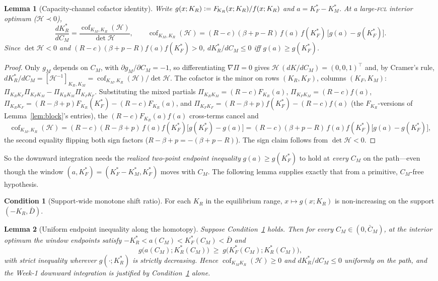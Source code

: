 \documentclass[11pt,reqno]{amsart}
\theoremstyle{plain}
\newtheorem{lemma}{Lemma}
\theoremstyle{definition}
\newtheorem{condition}{Condition}
\theoremstyle{remark}
\newcommand{\KR}{K_R}
\newcommand{\KF}{K_F}
\newcommand{\KM}{K_M}
\newcommand{\KRs}{K_R^{*}}
\newcommand{\KFs}{K_F^{*}}
\newcommand{\KMs}{K_M^{*}}
\newcommand{\Dbar}{\bar D}
\newcommand{\CM}{C_M}
\newcommand{\CMbar}{\bar C_M}
\newcommand{\bp}{\beta+p}
\newcommand{\FKR}{F_{\!\KR}}
\newcommand{\eqdef}{\vcentcolon=}
\newcommand{\Hcal}{\mathcal H}
\newcommand{\cof}{\operatorname{cof}}
\begin{document}
\begin{lemma}[Capacity-channel cofactor identity]\label{lem:cofactor}
Write $g(x;\KR)\eqdef\FKR(x;\KR)/f(x;\KR)$ and $a=\KFs-\KMs$. At a large-\textsc{fcl}
interior optimum ($\Hcal\prec0$),
\begin{equation}\label{eq:cofactor}
  \frac{d\KRs}{d\CM}=\frac{\cof_{\KM,\KR}(\Hcal)}{\det\Hcal},
  \qquad
  \cof_{\KM,\KR}(\Hcal)=(R-c)(\bp-R)\,f(a)\,f(\KFs)\,\big[g(a)-g(\KFs)\big].
\end{equation}
Since $\det\Hcal<0$ and $(R-c)(\bp-R)f(a)f(\KFs)>0$, $d\KRs/d\CM\le0$ \emph{iff}
$g(a)\ge g(\KFs)$.
\end{lemma}
\begin{proof}
Only $g_M$ depends on $\CM$, with $\partial g_M/\partial\CM=-1$, so differentiating
$\nabla\Pi=0$ gives $\Hcal\,(dK/d\CM)=(0,0,1)^{\!\top}$ and, by Cramer's rule,
$d\KRs/d\CM=[\Hcal^{-1}]_{\KR,\KM}=\cof_{\KM,\KR}(\Hcal)/\det\Hcal$. The cofactor is
the minor on rows $(\KR,\KF)$, columns $(\KF,\KM)$:
$\Pi_{\KR\KF}\Pi_{\KF\KM}-\Pi_{\KR\KM}\Pi_{\KF\KF}$. Substituting the mixed partials
$\Pi_{\KR\KM}=(R-c)\FKR(a)$, $\Pi_{\KF\KM}=(R-c)f(a)$,
$\Pi_{\KR\KF}=(R-\bp)\FKR(\KFs)-(R-c)\FKR(a)$, and
$\Pi_{\KF\KF}=(R-\bp)f(\KFs)-(R-c)f(a)$ (the $\FKR$-versions of
Lemma~\ref{lem:block}'s entries), the $(R-c)\FKR(a)f(a)$ cross-terms cancel and
\[
  \cof_{\KM,\KR}(\Hcal)=(R-c)(R-\bp)\,f(a)f(\KFs)\big[g(\KFs)-g(a)\big]
  =(R-c)(\bp-R)\,f(a)f(\KFs)\big[g(a)-g(\KFs)\big],
\]
the second equality flipping both sign factors ($R-\bp=-(\bp-R)$). The sign claim
follows from $\det\Hcal<0$.
\end{proof}

So the downward integration needs the \emph{realized two-point endpoint inequality}
$g(a)\ge g(\KFs)$ to hold at \emph{every} $\CM$ on the path---even though the
window $(a,\KFs)=(\KFs-\KMs,\KFs)$ moves with $\CM$. The following lemma supplies
exactly that from a primitive, $\CM$-free hypothesis.

\begin{condition}[Support-wide monotone shift ratio]\label{cond:gmono}
For each $\KR$ in the equilibrium range, $x\mapsto g(x;\KR)$ is non-increasing on
the support $(-\KR,\Dbar)$.
\end{condition}

\begin{lemma}[Uniform endpoint inequality along the homotopy]\label{lem:uniform}
Suppose Condition~\ref{cond:gmono} holds. Then for every $\CM\in(0,\CMbar)$, at
the interior optimum the window endpoints satisfy
$-\KRs<a(\CM)<\KFs(\CM)<\Dbar$ and
\begin{equation}\label{eq:endpoint}
  g\big(a(\CM);\KRs(\CM)\big)\;\ge\;g\big(\KFs(\CM);\KRs(\CM)\big),
\end{equation}
with strict inequality wherever $g(\cdot;\KRs)$ is strictly decreasing. Hence
$\cof_{\KM\KR}(\Hcal)\ge0$ and $d\KRs/d\CM\le0$ \emph{uniformly} on the path, and
the Week-1 downward integration is justified by Condition~\ref{cond:gmono} alone.
\end{lemma}
\end{document}
